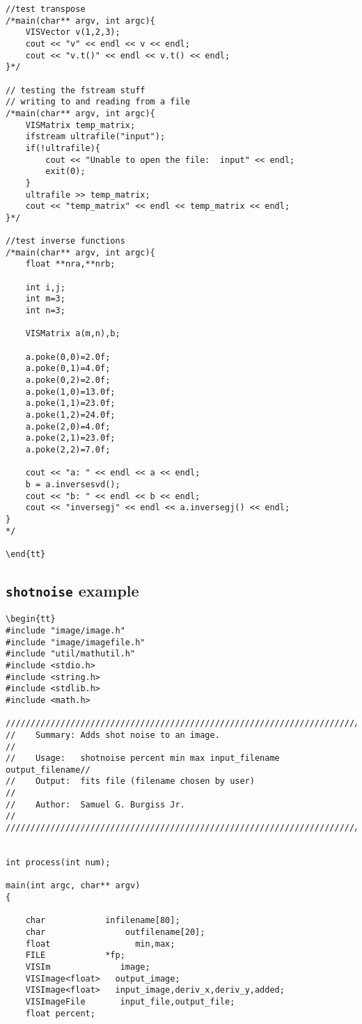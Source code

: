 \begin{appendix}
\begin{verbatim}
//test transpose
/*main(char** argv, int argc){
    VISVector v(1,2,3);
    cout << "v" << endl << v << endl;
    cout << "v.t()" << endl << v.t() << endl;
}*/

// testing the fstream stuff
// writing to and reading from a file
/*main(char** argv, int argc){
    VISMatrix temp_matrix;
    ifstream ultrafile("input");
    if(!ultrafile){
        cout << "Unable to open the file:  input" << endl;
        exit(0);
    }
    ultrafile >> temp_matrix;
    cout << "temp_matrix" << endl << temp_matrix << endl;
}*/

//test inverse functions
/*main(char** argv, int argc){
    float **nra,**nrb;

    int i,j;
    int m=3;
    int n=3;

    VISMatrix a(m,n),b;

    a.poke(0,0)=2.0f;
    a.poke(0,1)=4.0f;
    a.poke(0,2)=2.0f;
    a.poke(1,0)=13.0f;
    a.poke(1,1)=23.0f;
    a.poke(1,2)=24.0f;
    a.poke(2,0)=4.0f;
    a.poke(2,1)=23.0f;
    a.poke(2,2)=7.0f;
    
    cout << "a: " << endl << a << endl;
    b = a.inversesvd();
    cout << "b: " << endl << b << endl;
    cout << "inversegj" << endl << a.inversegj() << endl;
}
*/

\end{tt}
\end{verbatim}

\subsection{{\tt shotnoise} example}
\begin{verbatim}
\begin{tt}
#include "image/image.h"
#include "image/imagefile.h"
#include "util/mathutil.h"
#include <stdio.h>
#include <string.h>
#include <stdlib.h>
#include <math.h>

/////////////////////////////////////////////////////////////////////////
//    Summary: Adds shot noise to an image.                            //
//    Usage:   shotnoise percent min max input_filename output_filename//
//    Output:  fits file (filename chosen by user)                     //
//    Author:  Samuel G. Burgiss Jr.                                   //
/////////////////////////////////////////////////////////////////////////


int process(int num);

main(int argc, char** argv)
{

    char 	        infilename[80];
    char                outfilename[20];
    float                 min,max;
    FILE  	        *fp;
    VISIm              image;
    VISImage<float>   output_image;
    VISImage<float>   input_image,deriv_x,deriv_y,added;
    VISImageFile       input_file,output_file;
    float percent;


\end{verbatim}
\end{appendix}
